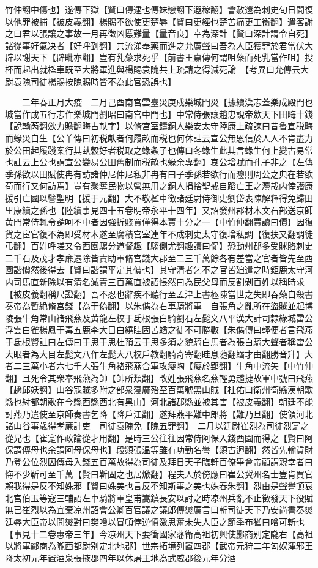 竹仲翻中傷也】遂傳下獄【賢曰傳逮也傳妹戀翻下遐稼翻】會赦還為刺史旬日間復以他罪被捕【被皮義翻】楊賜不欲使更楚辱【賢曰更經也楚苦痛更工衡翻】遣客謝之曰君以張讓之事故一月再徵凶慝難量【量音良】幸為深計【賢曰深計謂令自死】諸從事好氣决者【好呼到翻】共流涕奉藥而進之允厲聲曰吾為人臣獲罪於君當伏大辟以謝天下【辟毗亦翻】豈有乳藥求死乎【前書王嘉傳何謂咀藥而死乳當作咀】投杯而起出就檻車既至大將軍進與楊賜袁隗共上疏請之得減死論　【考異曰允傳云大尉袁隗司徒楊賜按隗賜時皆不為此官恐誤也】

　　二年春正月大疫　二月己酉南宫雲臺災庚戍樂城門災【據續漢志蓋樂成殿門也城當作成五行志作樂城門劉昭曰南宫中門也】中常侍張讓趙忠說帝歛天下田畮十錢【說輸芮翻歛力贍翻畮古畒字】以脩宫室鑄銅人樂安太守陸康上疏諫曰昔魯宣税畮而蝝災自生【公羊傳曰初税畒者何履畝而税也何休註云宣公無恩信於人人不肯盡力於公田起履踐案行其畒穀好者税取之蝝螽子也傳曰冬蝝生此其言蝝生何上變古易常也註云上公也謂宣公變易公田舊制而税畝也蝝余專翻】哀公增賦而孔子非之【左傳季孫欲以田賦使冉有訪諸仲尼仲尼私非冉有曰子季孫若欲行而灋則周公之典在若欲苟而行又何訪焉】豈有聚奪民物以營無用之銅人捐捨聖戒自蹈亡王之灋哉内倖譖康援引亡國以譬聖明【援于元翻】大不敬檻車徵諸廷尉侍御史劉岱表陳解釋得免歸田里康續之孫也【陸續事見四十五卷明帝永平十四年】又詔發州郡材木文石部送京師黄門常侍輒令譴呵不中者因強折賤買僅得本賈十分之一【中竹仲翻賈讀曰價】因復貨之宦官復不為即受材木遂至腐積宫室連年不成刺史太守復增私調【復扶又翻調徒弔翻】百姓呼嗟又令西園騶分道督趣【騶側尤翻趣讀曰促】恐動州郡多受賕賂刺史二千石及茂才孝亷遷除皆責助軍脩宫錢大郡至二三千萬餘各有差當之官者皆先至西園諧價然後得去【賢曰諧謂平定其價也】其守清者乞不之官皆廹遣之時鉅鹿太守河内司馬直新除以有清名減責三百萬直被詔悵然曰為民父母而反割剝百姓以稱時求【被皮義翻稱尺證翻】吾不忍也辭疾不聽行至孟津上書極陳當世之失即吞藥自殺書奏帝為暫絶脩宫錢【為于偽翻】以朱儁為右車騎將軍　自張角之亂所在盜賊並起博陵張牛角常山禇飛燕及黄龍左校于氐根張白騎劉石左髭文八平漢大計司隸綠城雷公浮雲白雀楊鳳于毒五鹿李大目白繞眭固苦蝤之徒不可勝數【朱儁傳曰輕便者言飛燕于氐根賢註曰左傳曰于思于思杜預云于思多須之貌騎白馬者為張白騎大聲者稱雷公大眼者為大目左髭文八作左髭大八校戶教翻騎奇寄翻眭息隨翻蝤才由翻勝音升】大者二三萬小者六七千人張牛角褚飛燕合軍攻癭陶【癭於郢翻】牛角中流矢【中竹仲翻】且死令其衆奉飛燕為帥【帥所類翻】改姓張飛燕名燕輕勇趫捷故軍中號曰飛燕【趫邱妖翻】山谷寇賊多附之部衆寖廣殆至百萬號黑山賊【杜佑曰衛州衛縣漢朝歌縣也紂都朝歌在今縣西縣西北有黑山】河北諸郡縣並被其害【被皮義翻】朝廷不能討燕乃遣使至京師奏書乞降【降戶江翻】遂拜燕平難中郎將【難乃旦翻】使領河北諸山谷事歲得孝亷計吏　司徒袁隗免【隗五罪翻】　二月以廷尉崔烈為司徒烈寔之從兄也【崔寔作政論從才用翻】是時三公往往因常侍阿保入錢西園而得之【賢曰阿保謂傅母也余謂阿母保母也】段熲張温等雖有功勤名譽【熲古迥翻】然皆先輸貨財乃登公位烈因傳母入錢五百萬故得為司徒及拜日天子臨軒百僚畢會帝顧謂親幸者曰悔不少靳可至千萬【賢曰靳固之也居焮翻】程夫人於傍應曰崔公冀州名士豈肯買官賴我得是反不知姝邪【賢曰姝美也言反不知斯事之美也姝春朱翻】烈由是聲譽頓衰　北宫伯玉等寇三輔詔左車騎將軍皇甫嵩鎮長安以討之時凉州兵亂不止徵發天下役賦無已崔烈以為宜棄凉州詔會公卿百官議之議郎傳爕厲言曰斬司徒天下乃安尚書奏爕廷辱大臣帝以問爕對曰樊噲以冒頓悖逆憤激思奮未失人臣之節季布猶曰噲可斬也【事見十二卷惠帝三年】今凉州天下要衝國家藩衛高祖初興使酈商别定隴右【高祖以將軍酈商為隴西都尉别定北地郡】世宗拓境列置四郡【武帝元狩二年匈奴渾邪王降太初元年置酒泉張掖郡四年以休屠王地為武威郡後元年分酒